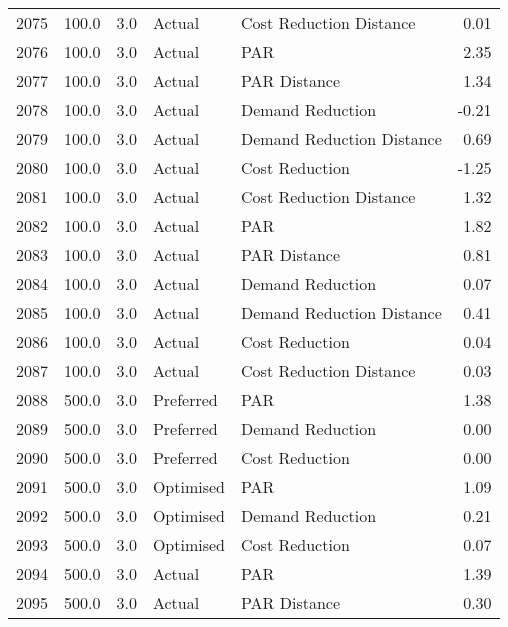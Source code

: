 \begin{longtable}{lrrllr}
2075 &        100.0 &     3.0 &         Actual &    Cost Reduction Distance &   0.01 \\
2076 &        100.0 &     3.0 &         Actual &                        PAR &   2.35 \\
2077 &        100.0 &     3.0 &         Actual &               PAR Distance &   1.34 \\
2078 &        100.0 &     3.0 &         Actual &           Demand Reduction &  -0.21 \\
2079 &        100.0 &     3.0 &         Actual &  Demand Reduction Distance &   0.69 \\
2080 &        100.0 &     3.0 &         Actual &             Cost Reduction &  -1.25 \\
2081 &        100.0 &     3.0 &         Actual &    Cost Reduction Distance &   1.32 \\
2082 &        100.0 &     3.0 &         Actual &                        PAR &   1.82 \\
2083 &        100.0 &     3.0 &         Actual &               PAR Distance &   0.81 \\
2084 &        100.0 &     3.0 &         Actual &           Demand Reduction &   0.07 \\
2085 &        100.0 &     3.0 &         Actual &  Demand Reduction Distance &   0.41 \\
2086 &        100.0 &     3.0 &         Actual &             Cost Reduction &   0.04 \\
2087 &        100.0 &     3.0 &         Actual &    Cost Reduction Distance &   0.03 \\
2088 &        500.0 &     3.0 &      Preferred &                        PAR &   1.38 \\
2089 &        500.0 &     3.0 &      Preferred &           Demand Reduction &   0.00 \\
2090 &        500.0 &     3.0 &      Preferred &             Cost Reduction &   0.00 \\
2091 &        500.0 &     3.0 &      Optimised &                        PAR &   1.09 \\
2092 &        500.0 &     3.0 &      Optimised &           Demand Reduction &   0.21 \\
2093 &        500.0 &     3.0 &      Optimised &             Cost Reduction &   0.07 \\
2094 &        500.0 &     3.0 &         Actual &                        PAR &   1.39 \\
2095 &        500.0 &     3.0 &         Actual &               PAR Distance &   0.30 \\

\end{longtable}
